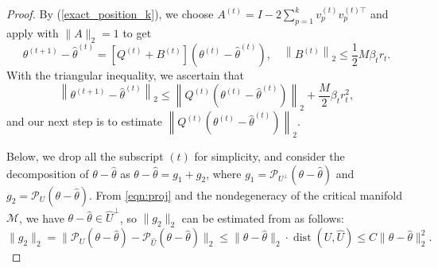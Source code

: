 \documentclass[final]{siamart251216}
\begin{document}
\begin{proof}
By (\ref{exact_position_k}), we choose $A^{(t)} = I-2\sum_{p=1}^k v_p^{(t)}{v_{p}^{(t)\top}}$ and apply  with $\|A\|_{2} = 1$ to get 
\begin{equation}\label{eqn:qbdecom}
\theta^{(t+1)}-\hat{\theta}^{(t)} = 
\left[Q^{(t)} + B^{(t)}\right] 
\left(\theta^{(t)}-\hat{\theta}^{(t)}\right),
\quad
\left\|B^{(t)}\right\|_2\leqslant
\frac{1}{2}M\beta_tr_t.
\end{equation}
With the triangular inequality, we ascertain that
\begin{equation}\label{eqn:rbound1}
\left\|\theta^{(t+1)}-\hat{\theta}^{(t)}\right\|_2\leqslant
\left\|Q^{(t)}  \left(\theta^{(t)}-\hat{\theta}^{(t)}\right)\right\|_2 
+ \frac{M}{2}\beta_tr_t^2,
\end{equation}
and our next step is to estimate $\left\|Q^{(t)}\left(\theta^{(t)}-\hat{\theta}^{(t)}\right)\right\|_2$.

Below, we drop all the subscript $(t)$ for simplicity, and consider the decomposition of $\theta-\hat{\theta}$ as $\theta-\hat{\theta}=g_1+g_2$, 
where $g_1=\mathcal{P}_{U^\perp}(\theta-\hat{\theta})$ 
and $g_2=\mathcal{P}_{U}(\theta-\hat{\theta})$. 
From \eqref{eqn:proj} and the nondegeneracy of the critical manifold $\mathcal{M}$, we have $\theta-{\hat{\theta}}
\in {\widehat{U}}^\perp$, so $\|g_2\|_2$ can be estimated from  as follows:
\begin{equation}
\|g_2\|_2
=\|\mathcal{P}_{U}(\theta-\hat{\theta})-\mathcal{P}_{\widehat{U}}(\theta-\hat{\theta})\|_2
\leqslant \|\theta-\hat{\theta}\|_2 \cdot
\operatorname{dist}(U, \widehat{U})
\leqslant C\|\theta-\hat{\theta}\|_2^2.
\label{eqn:residual}
\end{equation}


\end{proof}
\end{document}

